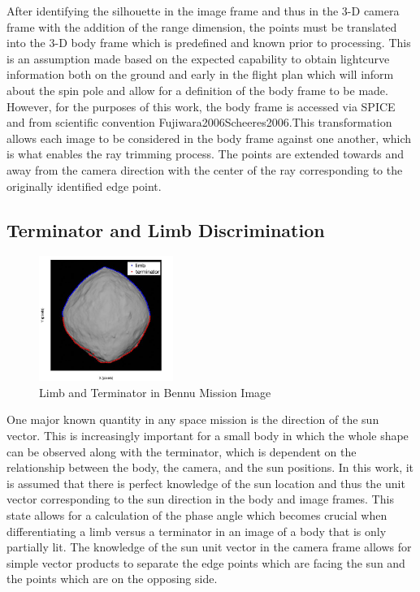 After identifying the silhouette in the image frame and thus in the 3-D camera frame with the addition of the range dimension, the points must be translated into the 3-D body frame which is predefined and known prior to processing. This is an assumption made based on the expected capability to obtain lightcurve information both on the ground and early in the flight plan which will inform about the spin pole and allow for a definition of the body frame to be made. However, for the purposes of this work, the body frame is accessed via SPICE and from scientific convention {Fujiwara2006}{Scheeres2006}.This transformation allows each image to be considered in the body frame against one another, which is what enables the ray trimming process. The points are extended towards and away from the camera direction with the center of the ray corresponding to the originally identified edge point. %
\subsection{Terminator and Limb Discrimination}
\begin{figure}
    \centering
    \vspace{-25pt}
    \captionsetup{justification=centering}
    \includegraphics[width = 0.39\textwidth]{fig/limb_term_bennu_correct.jpeg}
    \caption{Limb and Terminator in Bennu Mission Image}
    \label{fig:limbwterm}
\end{figure}
One major known quantity in any space mission is the direction of the sun vector. This is increasingly important for a small body in which the whole shape can be observed along with the terminator, which is dependent on the relationship between the body, the camera, and the sun positions. In this work, it is assumed that there is perfect knowledge of the sun location and thus the unit vector corresponding to the sun direction in the body and image frames. This state allows for a calculation of the phase angle which becomes crucial when differentiating a limb versus a terminator in an image of a body that is only partially lit. The knowledge of the sun unit vector in the camera frame allows for simple vector products to separate the edge points which are facing the sun and the points which are on the opposing side. %


